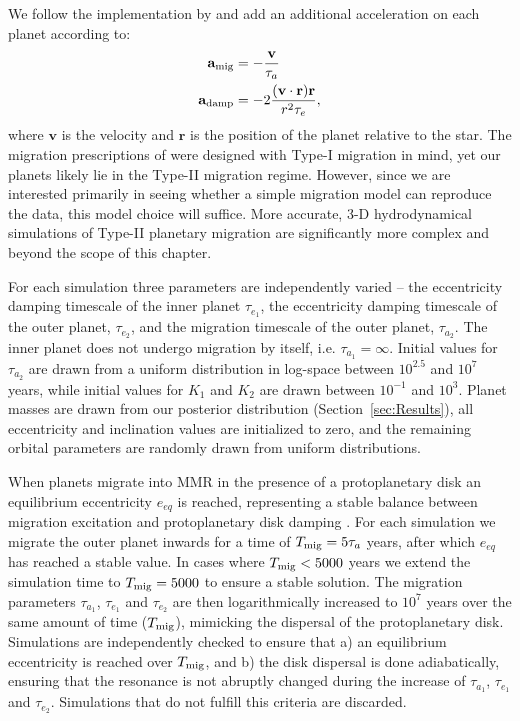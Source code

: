 We follow the implementation by \cite{Papaloizou2000} and add an additional acceleration on each planet according to:
\begin{align*}
\begin{split}
\textbf{a}_{\rm mig} &=  -\frac{\textbf{v}}{\tau_a} \\
\textbf{a}_{\rm damp} &= -2\frac{(\textbf{v}\cdot\textbf{r})\textbf{r}}{r^2\tau_e},
\end{split}
\end{align*}
where $\textbf{v}$ is the velocity and $\textbf{r}$ is the position of the planet relative to the star. 
The migration prescriptions of \citet{Papaloizou2000} were designed with Type-I migration in mind, yet our planets likely lie in the Type-II migration regime.
However, since we are interested primarily in seeing whether a simple migration model can reproduce the data, this model choice will suffice. 
More accurate, 3-D hydrodynamical simulations of Type-II planetary migration are significantly more complex and beyond the scope of this chapter. 

For each simulation three parameters are independently varied -- the eccentricity damping timescale of the inner planet $\tau_{e_1}$, the eccentricity damping timescale of the outer planet, $\tau_{e_2}$, and the migration timescale of the outer planet, $\tau_{a_2}$.
The inner planet does not undergo migration by itself, i.e. $\tau_{a_1} = \infty$.
Initial values for $\tau_{a_2}$ are drawn from a uniform distribution in log-space between $10^{2.5}$ and $10^7$ years, while initial values for $K_1$ and $K_2$ are drawn between $10^{-1}$ and $10^3$.
Planet masses are drawn from our posterior distribution (Section~\ref{sec:Results}), all eccentricity and inclination values are initialized to zero, and the remaining orbital parameters are randomly drawn from uniform distributions. 

When planets migrate into MMR in the presence of a protoplanetary disk an equilibrium eccentricity $e_{eq}$ is reached, representing a stable balance between migration excitation and protoplanetary disk damping \citep[e.g.][]{Goldreich2014}. 
For each simulation we migrate the outer planet inwards for a time of $T_{\rm mig} = 5\tau_a$ years, after which $e_{eq}$ has reached a stable value. 
In cases where $T_{\rm mig} < 5000$ years we extend the simulation time to $T_{\rm mig} = 5000$ to ensure a stable solution. 
The migration parameters $\tau_{a_1}$, $\tau_{e_1}$ and $\tau_{e_2}$ are then logarithmically increased to $10^7$ years over the same amount of time ($T_{\rm mig}$), mimicking the dispersal of the protoplanetary disk. 
Simulations are independently checked to ensure that a) an equilibrium eccentricity is reached over $T_{\rm mig}$, and b) the disk dispersal is done adiabatically, ensuring that the resonance is not abruptly changed during the increase of $\tau_{a_1}$, $\tau_{e_1}$ and $\tau_{e_2}$.
Simulations that do not fulfill this criteria are discarded.

